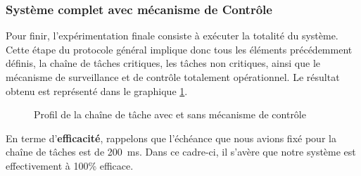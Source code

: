 \documentclass[french, a4paper, 11pt, twoside, pdftex]{StyleThese}
\begin{document}
\subsubsection{Système complet avec mécanisme de Contrôle}

Pour finir, l'expérimentation finale consiste à exécuter la totalité du système. Cette étape  du protocole général implique donc tous les éléments précédemment définis, la chaîne de tâches critiques, les tâches non critiques, ainsi que le mécanisme de surveillance et de contrôle totalement opérationnel. Le résultat obtenu est représenté dans le graphique \ref{graph:taskchain_Interference_Control}. 

\vspace{-3mm}
\begin{figure}[ht]
	\centering
	\scalebox{0.9}{}
	\captionsetup{justification=centering}
	\caption{Profil de la chaîne de tâche avec et sans mécanisme de contrôle}
	\label{graph:taskchain_Interference_Control}
\end{figure}

En terme d'\textbf{efficacité}, rappelons que l'échéance que nous avions fixé pour la chaîne de tâches est de 200~ms. Dans ce cadre-ci, il s'avère que notre système est effectivement à 100\% efficace. 
\end{document}
